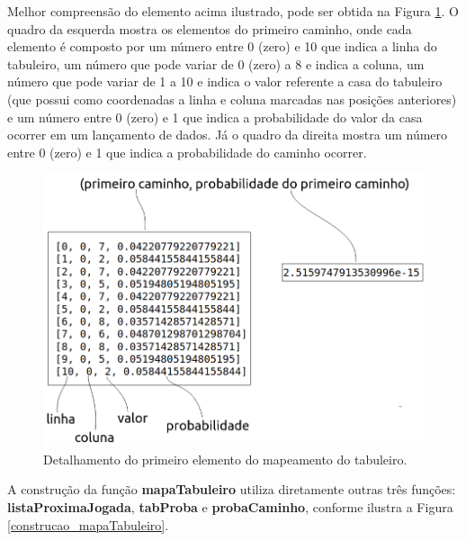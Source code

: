 \documentclass[12pt]{article}
\begin{document}
%

Melhor compreensão do elemento acima ilustrado, pode ser obtida na Figura \ref{explicacao_primeiro_elemento_mapeado}. O quadro da esquerda mostra os elementos do primeiro caminho, onde cada elemento é composto por um número entre 0 (zero) e 10 que indica a linha do tabuleiro, um número que pode variar de 0 (zero) a 8 e indica a coluna, um número que pode variar de 1 a 10 e indica o valor referente a casa do tabuleiro (que possui como coordenadas a linha e coluna marcadas nas posições anteriores) e um número entre 0 (zero) e 1 que indica a probabilidade do valor da casa ocorrer em um lançamento de dados. Já o quadro da direita mostra um número entre 0 (zero) e 1 que indica a probabilidade do caminho ocorrer.

\begin{figure}[ht!]
	\centering
	\includegraphics[width=0.8\linewidth]{img/explicacao_primeiro_elemento_mapeado.png}
	\caption{Detalhamento do primeiro elemento do mapeamento do tabuleiro.}
	\label{explicacao_primeiro_elemento_mapeado}
\end{figure}

A construção da função \textbf{mapaTabuleiro} utiliza diretamente outras três funções: \textbf{listaProximaJogada}, \textbf{tabProba} e \textbf{probaCaminho}, conforme ilustra a Figura \ref{construcao_mapaTabuleiro}.
\end{document}
